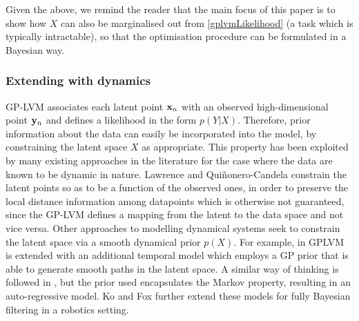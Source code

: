 \documentclass [10pt , a4paper]{article}
\begin{document}
\par Given the above, we remind the reader that the main focus of this paper is to show how $X$ can also be marginalised out
from \eqref{gplvmLikelihood} (a task which is typically intractable), so that
the optimisation procedure can be formulated in a Bayesian way.


\subsubsection{\label{section:gplvmDynamics}Extending with dynamics}

GP-LVM associates each latent point $\mathbf{x}_n$ with an observed high-dimensional point $\mathbf{y}_n$ and defines a likelihood
 in the form $p(Y|X)$. Therefore, prior information about the data can easily be incorporated into the model, by
 constraining the latent space $X$ as appropriate. This property has been exploited by many existing approaches in 
the literature for the case where the data are known to be dynamic in nature. 
Lawrence and Qui{\~n}onero-Candela \cite{GPLVMbackConstraints} constrain the latent points so as to be a function of
 the observed ones, in order to preserve the local distance information among datapoints which is otherwise not guaranteed,
 since the GP-LVM defines a mapping from the latent to the data space and not vice versa. Other approaches to modelling dynamical systems
 seek to constrain the latent space via a smooth dynamical prior $p(X)$. For example, in \cite{hgplvm} GPLVM is extended
 with an additional temporal model which employs a GP prior that is able to generate smooth paths in the latent space.
 A similar way of thinking is followed in \cite{GPDM,Wang:gpdm08}, but the prior used encapsulates the Markov property,
 resulting in an auto-regressive model. Ko and Fox \cite{GP-Based,GP-Based2} further extend these models for fully
 Bayesian filtering in a robotics setting.



%
%
%
%
\end{document}
